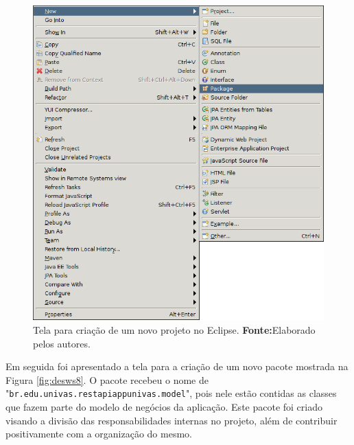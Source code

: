 	\begin{figure}[h!]
		\centerline{\includegraphics[scale=0.8]{./imagens/2_q_metodologico/4_procedimentos_resultados/43_webservice/432_desenvolvimento/desws7.png}}
		\caption[Tela para criação de um novo projeto no Eclipse]{Tela para criação de um novo projeto no Eclipse.
			\textbf{Fonte:}Elaborado pelos autores.}
		\label{fig:desws7}
	\end{figure}
	
	\pagebreak 
	
	\par Em seguida foi apresentado a tela para a criação de um novo pacote
mostrada na Figura \ref{fig:desws8}. O pacote recebeu o nome de
"\texttt{br.edu.univas.restapiappunivas.model}", pois nele estão contidas as
classes que fazem parte do modelo de negócios da aplicação. Este pacote foi
criado visando a divisão das responsabilidades internas no projeto, além de
contribuir positivamente com a organização do mesmo.

